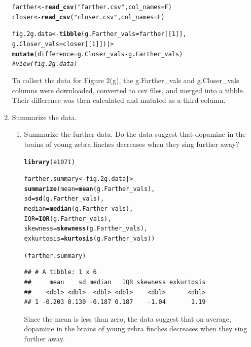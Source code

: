 \documentclass{article}\usepackage[]{graphicx}\usepackage[]{xcolor}
\makeatletter
\newcommand{\hlnum}[1]{\textcolor[rgb]{0.686,0.059,0.569}{#1}}%
\newcommand{\hlsng}[1]{\textcolor[rgb]{0.192,0.494,0.8}{#1}}%
\newcommand{\hlcom}[1]{\textcolor[rgb]{0.678,0.584,0.686}{\textit{#1}}}%
\newcommand{\hlopt}[1]{\textcolor[rgb]{0,0,0}{#1}}%
\newcommand{\hldef}[1]{\textcolor[rgb]{0.345,0.345,0.345}{#1}}%
\newcommand{\hlkwb}[1]{\textcolor[rgb]{0.69,0.353,0.396}{#1}}%
\newcommand{\hlkwc}[1]{\textcolor[rgb]{0.333,0.667,0.333}{#1}}%
\newcommand{\hlkwd}[1]{\textcolor[rgb]{0.737,0.353,0.396}{\textbf{#1}}}%
\newenvironment{kframe}{%
 \def\at@end@of@kframe{}%
 \ifinner\ifhmode%
  \def\at@end@of@kframe{\end{minipage}}%
  \begin{minipage}{\columnwidth}%
 \fi\fi%
 \def\FrameCommand##1{\hskip\@totalleftmargin \hskip-\fboxsep
 \colorbox{shadecolor}{##1}\hskip-\fboxsep
     \hskip-\linewidth \hskip-\@totalleftmargin \hskip\columnwidth}%
 \MakeFramed {\advance\hsize-\width
   \@totalleftmargin\z@ \linewidth\hsize
   \@setminipage}}%
 {\par\unskip\endMakeFramed%
 \at@end@of@kframe}
\newenvironment{knitrout}{}{} %
\makeatother
\begin{document}
\begin{enumerate}
\begin{knitrout}
\begin{kframe}
\begin{alltt}
\hldef{farther} \hlkwb{<-} \hlkwd{read_csv}\hldef{(}\hlsng{"farther.csv"}\hldef{,}\hlkwc{col_names} \hldef{= F)}
\hldef{closer} \hlkwb{<-} \hlkwd{read_csv}\hldef{(}\hlsng{"closer.csv"}\hldef{,}\hlkwc{col_names} \hldef{= F)}

\hldef{fig.2g.data} \hlkwb{<-} \hlkwd{tibble}\hldef{(}\hlkwc{g.Farther_vals} \hldef{= farther[[}\hlnum{1}\hldef{]],}
                      \hlkwc{g.Closer_vals} \hldef{= closer[[}\hlnum{1}\hldef{]]) |>}
  \hlkwd{mutate}\hldef{(}\hlkwc{difference} \hldef{= g.Closer_vals} \hlopt{-} \hldef{g.Farther_vals)}
\hlcom{#view(fig.2g.data)}
\end{alltt}
\end{kframe}
\end{knitrout}

To collect the data for Figure 2(g), the g.Farther\_vals and g.Closer\_vals columns were downloaded, converted to csv files, and merged into a tibble. Their difference was then calculated and mutated as a third column.

\item Summarize the data.
\begin{enumerate}
  \item Summarize the further data. Do the data suggest that
   dopamine in the brains of young zebra finches decreases when
   they sing further away?

\begin{knitrout}\scriptsize
{}\color{fgcolor}\begin{kframe}
\begin{alltt}
\hlkwd{library}\hldef{(e1071)}

\hldef{farther.summary} \hlkwb{<-} \hldef{fig.2g.data |>}
  \hlkwd{summarize}\hldef{(}\hlkwc{mean}       \hldef{=} \hlkwd{mean}\hldef{(g.Farther_vals),}
            \hlkwc{sd}         \hldef{=} \hlkwd{sd}\hldef{(g.Farther_vals),}
            \hlkwc{median}     \hldef{=} \hlkwd{median}\hldef{(g.Farther_vals),}
            \hlkwc{IQR}        \hldef{=} \hlkwd{IQR}\hldef{(g.Farther_vals),}
            \hlkwc{skewness}   \hldef{=} \hlkwd{skewness}\hldef{(g.Farther_vals),}
            \hlkwc{exkurtosis} \hldef{=} \hlkwd{kurtosis}\hldef{(g.Farther_vals))}

\hldef{(farther.summary)}
\end{alltt}
\begin{verbatim}
## # A tibble: 1 x 6
##     mean    sd median   IQR skewness exkurtosis
##    <dbl> <dbl>  <dbl> <dbl>    <dbl>      <dbl>
## 1 -0.203 0.130 -0.187 0.187    -1.04       1.19
\end{verbatim}
\end{kframe}
\end{knitrout}
Since the mean is less than zero, the data suggest that on average, dopamine in the brains of young zebra finches decreases when they sing further away.


\end{enumerate}
\end{enumerate}
\end{document}
